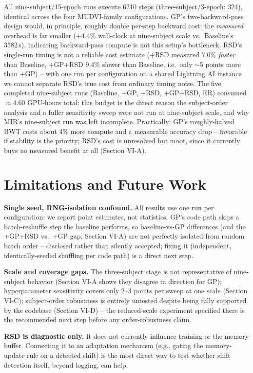 \documentclass[conference]{IEEEtran}
\begin{document}
All nine-subject/15-epoch runs execute 6210 steps (three-subject/3-epoch: 324), identical across the four MUDVI-family configurations. GP's two-backward-pass design would, in principle, roughly double per-step backward cost; the \emph{measured} overhead is far smaller (+4.4\% wall-clock at nine-subject scale vs.\ Baseline's 3582\,s), indicating backward-pass compute is not this setup's bottleneck. RSD's single-run timing is not a reliable cost estimate (+RSD measured 7.0\% \emph{faster} than Baseline, +GP+RSD 9.4\% slower than Baseline, i.e.\ only $\sim$5 points more than +GP) -- with one run per configuration on a shared Lightning AI instance we cannot separate RSD's true cost from ordinary timing noise. The five completed nine-subject runs (Baseline, +GP, +RSD, +GP+RSD, ER) consumed $\approx$4.60 GPU-hours total; this budget is the direct reason the subject-order analysis and a fuller sensitivity sweep were not run at nine-subject scale, and why MIR's nine-subject run was left incomplete. Practically: GP's roughly-halved BWT costs about 4\% more compute and a measurable accuracy drop -- favorable if stability is the priority; RSD's cost is unresolved but moot, since it currently buys no measured benefit at all (Section VI-A).

\section{Limitations and Future Work}

\textbf{Single seed, RNG-isolation confound.} All results use one run per configuration; we report point estimates, not statistics. GP's code path skips a batch-reshuffle step the baseline performs, so baseline-vs-GP differences (and the +GP+RSD vs.\ +GP gap, Section VI-A) are not perfectly isolated from random batch order -- disclosed rather than silently accepted; fixing it (independent, identically-seeded shuffling per code path) is a direct next step.

\textbf{Scale and coverage gaps.} The three-subject stage is not representative of nine-subject behavior (Section VI-A shows they disagree in direction for GP); hyperparameter sensitivity covers only 2--3 points per sweep at one scale (Section VI-C); subject-order robustness is entirely untested despite being fully supported by the codebase (Section VI-D) -- the reduced-scale experiment specified there is the recommended next step before any order-robustness claim.

\textbf{RSD is diagnostic only.} It does not currently influence training or the memory buffer. Connecting it to an adaptation mechanism (e.g., gating the memory-update rule on a detected shift) is the most direct way to test whether shift detection itself, beyond logging, can help.
\end{document}
